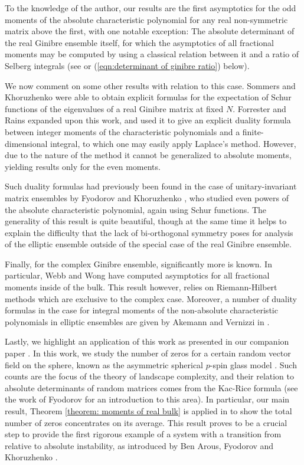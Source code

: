 \documentclass[12pt]{article}
\numberwithin{info}{section}
\numberwithin{equation}{section}
\renewcommand{\[}{\begin{equation}}
\renewcommand{\]}{\end{equation}}
\newcommand{\<}{\langle}
\renewcommand{\>}{\rangle}
\begin{document}
	To the knowledge of the author, our results are the first asymptotics for the odd moments of the absolute characteristic polynomial for any real non-symmetric matrix above the first, with one notable exception: The absolute determinant of the real Ginibre ensemble itself, for which the asymptotics of all fractional moments may be computed by using a classical relation between it and a ratio of Selberg integrals (see \cite{nickrecent} or (\ref{eqn:determinant of ginibre ratio}) below).
	
	We now comment on some other results with relation to this case. Sommers and Khoruzhenko \cite{khoruzhenko-matrix-averages} were able to obtain explicit formulas for the expectation of Schur functions of the eigenvalues of a real Ginibre matrix at fixed $N$. Forrester and Rains \cite{forrester-matrix-averages} expanded upon this work, and used it to give an explicit duality formula between integer moments of the characteristic polynomials and a finite-dimensional integral, to which one may easily apply Laplace's method. However, due to the nature of the method it cannot be generalized to absolute moments, yielding results only for the even moments. 
	
	Such duality formulas had previously been found in the case of unitary-invariant matrix ensembles by Fyodorov and Khoruzhenko \cite{uni-hermite-fyodorov}, who studied even powers of the absolute characteristic polynomial, again using Schur functions. The generality of this result is quite beautiful, though at the same time it helps to explain the difficulty that the lack of bi-orthogonal symmetry poses for analysis of the elliptic ensemble outside of the special case of the real Ginibre ensemble.
	
	Finally, for the complex Ginibre ensemble, significantly more is known. In particular, Webb and Wong \cite{webbwong} have computed asymptotics for all fractional moments inside of the bulk. This result however, relies on Riemann-Hilbert methods which are exclusive to the complex case. Moreover, a number of duality formulas in the case for integral moments of the non-absolute characteristic polynomials in elliptic ensembles are given by Akemann and Vernizzi in \cite{moments-and-duality-ginibre-elliptic}.
	
	Lastly, we highlight an application of this work as presented in our companion paper \cite{kivimae}. In this work, we study the number of zeros for a certain random vector field on the sphere, known as the asymmetric spherical $p$-spin glass model \cite{original-glassy,complexity-fyodorov-non-gradient}. Such counts are the focus of the theory of landscape complexity, and their relation to absolute determinants of random matrices comes from the Kac-Rice formula (see the work of Fyodorov \cite{fyo1} for an introduction to this area). In particular, our main result, Theorem \ref{theorem: moments of real bulk} is applied in \cite{kivimae} to show the total number of zeros concentrates on its average. This result proves to be a crucial step to provide the first rigorous example of a system with a transition from relative to absolute instability, as introduced by Ben Arous, Fyodorov and Khoruzhenko \cite{fyo-maywigner-1,fyo-maywigner-2}. 
	
\end{document}

